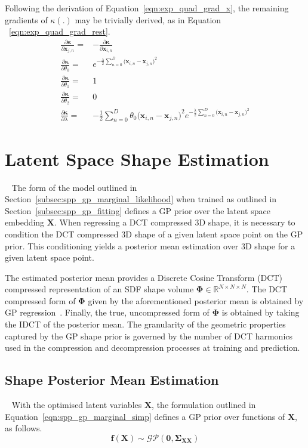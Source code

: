 Following the derivation of Equation~\ref{eqn:exp_quad_grad_x}, the remaining 
gradients of \( \kappa(.) \) may be trivially derived, as in Equation
~\ref{eqn:exp_quad_grad_rest}.
\begin{align}
  \label{eqn:exp_quad_grad_rest}
  \frac{\partial \bm{\kappa}}{\partial \bm{x}_{j, n}} ={}& 
  -\frac{\partial \bm{\kappa}}{\partial \bm{x}_{i, n}}\\
  \frac{\partial \bm{\kappa}}{\partial \theta_{0}} ={}&
  e^{-\frac{\lambda}{2} 
  \sum_{n = 0}^{D} {\big( \bm{x}_{i, n} - \bm{x}_{j, n} \big)}^{2}}\\
  \frac{\partial \bm{\kappa}}{\partial \theta_{1}} ={}& 1\\
  \frac{\partial \bm{\kappa}}{\partial \theta_{2}} ={}& 0\\
  \frac{\partial \bm{\kappa}}{\partial \lambda} ={}& 
  -\frac{1}{2} \sum_{n = 0}^{D} \theta_{0} {\big( \bm{x}_{i, n} - \bm{x}_{j, n} \big)}^{2}
  e^{-\frac{\lambda}{2} 
  \sum_{n = 0}^{D} {\big( \bm{x}_{i, n} - \bm{x}_{j, n} \big)}^{2}}
\end{align}

\section{Latent Space Shape Estimation}
~\label{sec:spp_latent_shape_est}
The form of the model outlined in Section~\ref{subsec:spp_gp_marginal_likelihood}
when trained as outlined in Section~\ref{subsec:spp_gp_fitting} defines a GP prior 
over the latent space embedding \( \bm{X} \). When regressing a DCT compressed 3D shape, it is 
necessary to condition the DCT compressed 3D shape of a given latent space point on the GP prior. 
This conditioning yields a posterior mean estimation over 3D shape for a given latent space point.

The estimated posterior mean provides a Discrete Cosine Transform (DCT) compressed representation 
of an SDF shape volume \( \bm{\Phi} \in \mathbb{R}^{N \times N \times N} \). The DCT compressed form 
of \( \bm{\Phi} \) given by the aforementioned posterior mean is obtained by GP regression~\cite{GPML}. 
Finally, the true, uncompressed form of \( \bm{\Phi} \) is obtained by taking the IDCT of the posterior mean. 
The granularity of the geometric properties captured by the GP shape prior is governed by the number of DCT 
harmonics used in the compression and decompression processes at training and prediction.

\subsection{Shape Posterior Mean Estimation}
~\label{subsec:spp_pos_mean_est}
With the optimised latent variables \( \bm{X} \), the formulation outlined in 
Equation~\ref{eqn:spp_gp_marginal_simp} defines a GP prior 
over functions of \( \bm{X} \), as follows.
\begin{equation}
  \label{eqn:gp_prior}
  \bm{f}(\bm{X}) \sim \mathcal{GP}(\bm{0}, \bm{\Sigma}_{\bm{XX}})
\end{equation}

